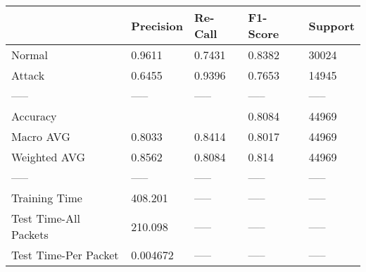 \begin{tabular}{lllll}
\toprule
{} & Precision & Re-Call & F1-Score & Support \\
\midrule
Normal                &    0.9611 &  0.7431 &   0.8382 &   30024 \\
Attack                &    0.6455 &  0.9396 &   0.7653 &   14945 \\
-----                 &     ----- &   ----- &    ----- &   ----- \\
Accuracy              &           &         &   0.8084 &   44969 \\
Macro AVG             &    0.8033 &  0.8414 &   0.8017 &   44969 \\
Weighted AVG          &    0.8562 &  0.8084 &    0.814 &   44969 \\
-----                 &     ----- &   ----- &    ----- &   ----- \\
Training Time         &   408.201 &   ----- &    ----- &   ----- \\
Test Time-All Packets &   210.098 &   ----- &    ----- &   ----- \\
Test Time-Per Packet  &  0.004672 &   ----- &    ----- &   ----- \\
\bottomrule
\end{tabular}
